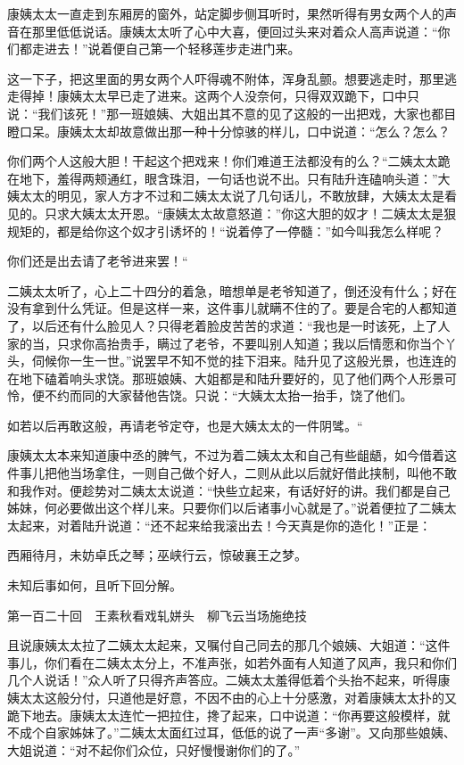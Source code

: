 \documentclass[12pt,UTF8]{ctexbook}
\begin{document}
{{{康姨太太一直走到东厢房的窗外，站定脚步侧耳听时，果然听得有男女两个人的声音在那里低低说话。康姨太太听了心中大喜，便回过头来对着众人高声说道：“你们都走进去！”说着便自己第一个轻移莲步走进门来。

这一下子，把这里面的男女两个人吓得魂不附体，浑身乱颤。想要逃走时，那里逃走得掉！康姨太太早已走了进来。这两个人没奈何，只得双双跪下，口中只说：“我们该死！”那一班娘姨、大姐出其不意的见了这般的一出把戏，大家也都目瞪口呆。康姨太太却故意做出那一种十分惊骇的样儿，口中说道：“怎么？怎么？

你们两个人这般大胆！干起这个把戏来！你们难道王法都没有的么？“二姨太太跪在地下，羞得两颊通红，眼含珠泪，一句话也说不出。只有陆升连磕响头道：”大姨太太的明见，家人方才不过和二姨太太说了几句话儿，不敢放肆，大姨太太是看见的。只求大姨太太开恩。“康姨太太故意怒道：”你这大胆的奴才！二姨太太是狠规矩的，都是给你这个奴才引诱坏的！“说着停了一停髓：”如今叫我怎么样呢？

你们还是出去请了老爷进来罢！“

二姨太太听了，心上二十四分的着急，暗想单是老爷知道了，倒还没有什么；好在没有拿到什么凭证。但是这样一来，这件事儿就瞒不住的了。要是合宅的人都知道了，以后还有什么脸见人？只得老着脸皮苦苦的求道：“我也是一时该死，上了人家的当，只求你高抬贵手，瞒过了老爷，不要叫别人知道；我以后情愿和你当个丫头，伺候你一生一世。”说罢早不知不觉的挂下泪来。陆升见了这般光景，也连连的在地下磕着响头求饶。那班娘姨、大姐都是和陆升要好的，见了他们两个人形景可怜，便不约而同的大家替他告饶。只说：“大姨太太抬一抬手，饶了他们。

如若以后再敢这般，再请老爷定夺，也是大姨太太的一件阴骘。“

康姨太太本来知道康中丞的脾气，不过为着二姨太太和自己有些龃龉，如今借着这件事儿把他当场拿住，一则自己做个好人，二则从此以后就好借此挟制，叫他不敢和我作对。便趁势对二姨太太说道：“快些立起来，有话好好的讲。我们都是自己姊妹，何必要做出这个样儿来。只要你们以后诸事小心就是了。”说着便拉了二姨太太起来，对着陆升说道：“还不起来给我滚出去！今天真是你的造化！”正是：

西厢待月，未妨卓氏之琴；巫峡行云，惊破襄王之梦。

未知后事如何，且听下回分解。





第一百二十回　王素秋看戏轧姘头　柳飞云当场施绝技





且说康姨太太拉了二姨太太起来，又嘱付自己同去的那几个娘姨、大姐道：“这件事儿，你们看在二姨太太分上，不准声张，如若外面有人知道了风声，我只和你们几个人说话！”众人听了只得齐声答应。二姨太太羞得低着个头抬不起来，听得康姨太太这般分付，只道他是好意，不因不由的心上十分感激，对着康姨太太扑的又跪下地去。康姨太太连忙一把拉住，搀了起来，口中说道：“你再要这般模样，就不成个自家姊妹了。”二姨太太面红过耳，低低的说了一声“多谢”。又向那些娘姨、大姐说道：“对不起你们众位，只好慢慢谢你们的了。”

}}}
\end{document}
